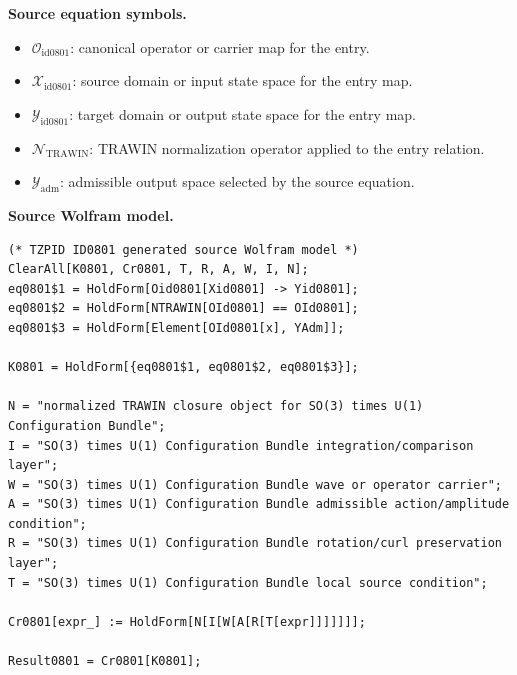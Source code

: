 \begin{minipage}[t]{0.49\linewidth}
\begingroup
\small
\raggedright
\textbf{Source equation symbols.}\par
\begin{itemize}[leftmargin=1.35em,itemsep=1pt,topsep=1pt,parsep=0pt]
    \item $\mathcal{O}_{\mathrm{id0801}}$: canonical operator or carrier map for the entry.
    \item $\mathcal{X}_{\mathrm{id0801}}$: source domain or input state space for the entry map.
    \item $\mathcal{Y}_{\mathrm{id0801}}$: target domain or output state space for the entry map.
    \item $\mathcal{N}_{\mathrm{TRAWIN}}$: TRAWIN normalization operator applied to the entry relation.
    \item $\mathcal{Y}_{\mathrm{adm}}$: admissible output space selected by the source equation.
\end{itemize}
\endgroup
\end{minipage}\hfill
\begin{minipage}[t]{0.47\linewidth}
\begingroup
\scriptsize
\raggedright
\textbf{Source Wolfram model.}\par
\begin{Verbatim}[fontsize=\tiny,breaklines=true,breakanywhere=true]
(* TZPID ID0801 generated source Wolfram model *)
ClearAll[K0801, Cr0801, T, R, A, W, I, N];
eq0801$1 = HoldForm[Oid0801[Xid0801] -> Yid0801];
eq0801$2 = HoldForm[NTRAWIN[OId0801] == OId0801];
eq0801$3 = HoldForm[Element[OId0801[x], YAdm]];

K0801 = HoldForm[{eq0801$1, eq0801$2, eq0801$3}];

N = "normalized TRAWIN closure object for SO(3) times U(1) Configuration Bundle";
I = "SO(3) times U(1) Configuration Bundle integration/comparison layer";
W = "SO(3) times U(1) Configuration Bundle wave or operator carrier";
A = "SO(3) times U(1) Configuration Bundle admissible action/amplitude condition";
R = "SO(3) times U(1) Configuration Bundle rotation/curl preservation layer";
T = "SO(3) times U(1) Configuration Bundle local source condition";

Cr0801[expr_] := HoldForm[N[I[W[A[R[T[expr]]]]]]];

Result0801 = Cr0801[K0801];
\end{Verbatim}
\endgroup
\end{minipage}


